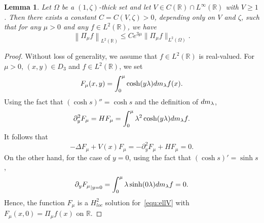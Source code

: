 \documentclass[a4paper,reqno]{amsart}
\newtheorem{lemma}[theorem]{Lemma}
\theoremstyle{definition}
\numberwithin{equation}{section}
\newcommand{\R}{\mathbb{R}}
\def \R {{\mathbb{R} }}
\def \d {{\rm{d}}}
\begin{document}
\begin{lemma}\label{le:spectra}
Let $\Omega$ be a $(1,\zeta)$-thick set and let $V\in C(\R)\cap L^{\infty}(\R)$ with $V\ge 1$.  Then there exists a constant $C=C(V,\zeta)>0$, depending only on $V$ and $\zeta$, such that for any $\mu>0$ and any $f\in L^{2}(\R)$, we have 
\begin{equation*}
\left\|\Pi_{\mu}f\right\|_{L^{2}(\R)}\le Ce^{3\mu}\|\Pi_{\mu}f\|_{L^{2}(\Omega)}.
\end{equation*}
\end{lemma}
\begin{proof}
Without loss of generality, we assume that $f\in L^2(\R)$ is real-valued. 
For $\mu>0$, $(x,y)\in D_{3}$ and $f\in L^{2}(\R)$, we set 
\begin{equation*}
F_{\mu}(x,y)=\int_{0}^{\mu}\cosh(y\lambda)\d m_{\lambda}f(x).
\end{equation*}
Using the fact that $(\cosh{s})''=\cosh s$ and the definition of $\d m_{\lambda}$, 
\begin{equation*}
\partial_{y}^{2}F_{\mu}={H}F_{\mu}=\int_{0}^{\mu}\lambda^{2}\cosh(y\lambda)\d m_{\lambda}f.
 \end{equation*}
 It follows that 
\begin{equation*}
-\Delta F_{\mu}+V(x)F_{\mu}=-\partial_{y}^{2}F_{\mu}+{H}F_{\mu}=0.
\end{equation*}
On the other hand, for the case of $y=0$, using the fact that $(\cosh s)'=\sinh s$,
\begin{equation*}
{\partial_{y}F_{\mu}}_{|y=0}=\int_{0}^{\mu}\lambda \sinh(0\lambda)\d m_{\lambda}f=0.
\end{equation*}
Hence, the function $F_{\mu}$ is a $H_{loc}^{2}$ solution for~\eqref{equ:ellV} with $F_{\mu}(x,0)=\Pi_{\mu}f(x)$ on $\mathbb{R}$. 


\end{proof}
\end{document}
